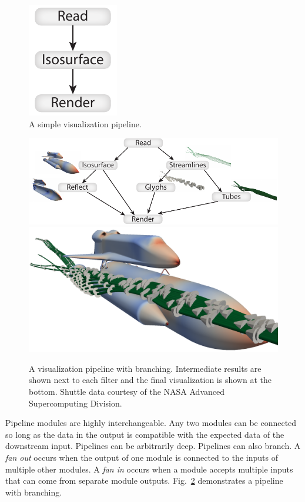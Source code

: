 \documentclass[journal,twocolumn,10pt,letterpaper,twoside]{IEEEtran}
\newcommand*{\figref}[1]{Fig.~\ref{#1}}
\newcommand*{\keyterm}[1]{\emph{#1}}
\begin{document}
\begin{figure}[htbp]
  \centering
  \includegraphics{images/SimplePipeline}
  \caption{A simple visualization pipeline.}
  \label{fig:SimplePipeline}
\end{figure}

\begin{figure}[htbp]
  \centering
  \includegraphics[width=5.5in]{images/BranchingPipeline2} \\
  \includegraphics[width=5in]{images/BranchingPipeline2Result}
  \caption{A visualization pipeline with branching.  Intermediate results
    are shown next to each filter and the final visualization is shown at
    the bottom.  Shuttle data courtesy of the NASA Advanced Supercomputing
    Division.}
  \label{fig:BranchingPipeline}
\end{figure}

Pipeline modules are highly interchangeable.  Any two modules can be
connected so long as the data in the output is compatible with the expected
data of the downstream input.  Pipelines can be arbitrarily deep.
Pipelines can also branch.  A \keyterm{fan out} occurs when the output of
one module is connected to the inputs of multiple other modules.  A
\keyterm{fan in} occurs when a module accepts multiple inputs that can
come from separate module outputs.  \figref{fig:BranchingPipeline}
demonstrates a pipeline with branching.
\end{document}
